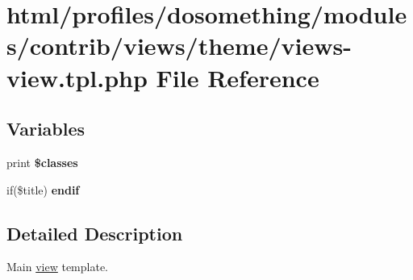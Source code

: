 \hypertarget{views-view_8tpl_8php}{
\section{html/profiles/dosomething/modules/contrib/views/theme/views-\/view.tpl.php File Reference}
\label{views-view_8tpl_8php}
}
\subsection*{Variables}
\begin{DoxyCompactItemize}
\item 
\hypertarget{views-view_8tpl_8php_a6d48ecbdbc70ca1812e665169b5fa1e2}{
print {\bfseries \$classes}}
\label{views-view_8tpl_8php_a6d48ecbdbc70ca1812e665169b5fa1e2}

\item 
\hypertarget{views-view_8tpl_8php_a97b8be73630a68d46603ea9f55f6957c}{
if(\$title) {\bfseries endif}}
\label{views-view_8tpl_8php_a97b8be73630a68d46603ea9f55f6957c}

\end{DoxyCompactItemize}


\subsection{Detailed Description}
Main \hyperlink{classview}{view} template.

